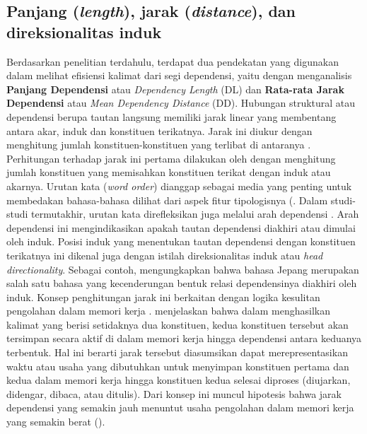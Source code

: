 \subsection{Panjang (\textit{length}), jarak (\textit{distance}), dan direksionalitas induk}

Berdasarkan penelitian terdahulu, terdapat dua pendekatan yang digunakan dalam melihat efisiensi kalimat dari segi dependensi, yaitu dengan menganalisis \textbf{Panjang Dependensi} atau \textit{Dependency Length} (DL) dan \textbf{Rata-rata Jarak Dependensi} atau \textit{Mean Dependency Distance} (DD).  Hubungan struktural atau dependensi berupa tautan langsung memiliki jarak linear yang membentang antara akar, induk dan konstituen terikatnya. Jarak ini diukur dengan menghitung jumlah konstituen-konstituen yang terlibat di antaranya \citep{heringer1980syntax}. Perhitungan terhadap jarak ini pertama dilakukan oleh \cite{heringer1980syntax} dengan menghitung jumlah konstituen yang memisahkan konstituen terikat dengan induk atau akarnya. Urutan kata (\textit{word order}) dianggap sebagai media yang penting untuk membedakan bahasa-bahasa dilihat dari aspek fitur tipologisnya (\citealp{greenberg1963some, dryer1992greenbergian}. Dalam studi-studi termutakhir, urutan kata direfleksikan juga melalui arah dependensi \citep{hudson2007language}. Arah dependensi ini mengindikasikan apakah tautan dependensi diakhiri atau dimulai oleh induk. Posisi induk yang menentukan tautan dependensi dengan konstituen terikatnya ini dikenal juga dengan istilah direksionalitas induk atau \textit{head directionality}. Sebagai contoh, \cite{hudson2003psychological} mengungkapkan bahwa bahasa Jepang merupakan salah satu bahasa yang kecenderungan bentuk relasi dependensinya diakhiri oleh induk. Konsep penghitungan jarak ini berkaitan dengan logika kesulitan pengolahan dalam memori kerja \citep{hudson2007language}. \cite{hudson2007language} menjelaskan bahwa dalam menghasilkan kalimat yang berisi setidaknya dua konstituen, kedua konstituen tersebut akan tersimpan secara aktif di dalam memori kerja hingga dependensi antara keduanya terbentuk. Hal ini berarti jarak tersebut diasumsikan dapat merepresentasikan waktu atau usaha yang dibutuhkan untuk menyimpan konstituen pertama dan kedua dalam memori kerja hingga konstituen kedua selesai diproses (diujarkan, didengar, dibaca, atau ditulis). Dari konsep ini muncul hipotesis bahwa jarak dependensi yang semakin jauh menuntut usaha pengolahan dalam memori kerja yang semakin berat (\citealp{hudson2007language, gibson1998linguistic}).

